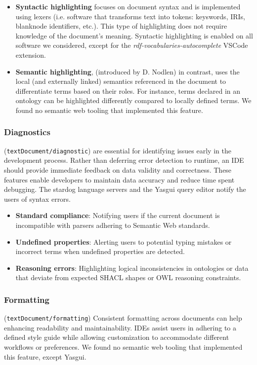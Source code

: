 \begin{itemize}
    \item \textbf{Syntactic highlighting} focuses on document syntax and is implemented using lexers (i.e. software that transforms text into tokens: keyswords, IRIs, blanknode identifiers, etc.).
      This type of highlighting does not require knowledge of the document's meaning.
      Syntactic highlighting is enabled on all software we considered, except for the 
      \textit{rdf-vocabularies-autocomplete} VSCode extension.
    \item \textbf{Semantic highlighting}, (introduced by D. Nodlen\cite{DNolden}) in contrast, uses the local (and externally linked) semantics referenced in the document to differentiate terms based on their roles. 
      For instance, terms declared in an ontology can be highlighted differently compared to locally defined terms.
      We found no semantic web tooling that implemented this feature.
\end{itemize}


\subsubsection{Diagnostics} (\texttt{textDocument/diagnostic}) are essential for identifying issues early in the development process. 
Rather than deferring error detection to runtime, an IDE should provide immediate feedback on data validity and correctness.
These features enable developers to maintain data accuracy and reduce time spent debugging. 
The stardog language servers and the Yasgui query editor notify the users of syntax errors.

\begin{itemize}
    \item \textbf{Standard compliance}: Notifying users if the current document is incompatible with parsers adhering to Semantic Web standards.
    \item \textbf{Undefined properties}: Alerting users to potential typing mistakes or incorrect terms when undefined properties are detected.
    \item \textbf{Reasoning errors}: Highlighting logical inconsistencies in ontologies or data that deviate from expected SHACL shapes or OWL reasoning constraints.
\end{itemize}


\subsubsection{Formatting} (\texttt{textDocument/formatting})
Consistent formatting across documents can help enhancing readability and maintainability.
IDEs assist users in adhering to a defined style guide while allowing customization to accommodate different workflows or preferences.
We found no semantic web tooling that implemented this feature, except Yasgui.

